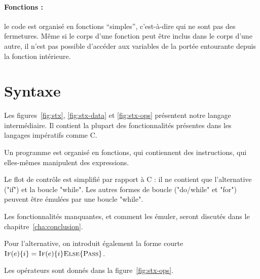 \paragraph{Fonctions :} le code est organisé en fonctions ``simples'',
c'est-à-dire qui ne sont pas des fermetures. Même si le corps
d'une fonction peut être inclus dans le corps d'une autre, il n'est pas possible
d'accéder aux variables de la portée entourante depuis la fonction intérieure.

\section{Syntaxe}

Les figures~\ref{fig:stx}, \ref{fig:stx-data} et \ref{fig:stx-ops} présentent
notre langage intermédiaire. Il contient la plupart des fonctionnalités
présentes dans les langages impératifs comme C.


Un programme est organisé en fonctions, qui contiennent des instructions, qui
elles-mêmes manipulent des expressions.

Le flot de contrôle est simplifié par rapport à C : il ne contient que
l'alternative ("if") et la boucle "while". Les autres formes de boucle
("do/while" et "for") peuvent être émulées par une boucle "while".

Les fonctionnalités manquantes, et comment les émuler, seront discutés dans le
chapitre~\ref{cha:conclusion}. %

Pour l'alternative, on introduit également la forme courte $\textsc{If}(e) \{ i \} =
\textsc{If}(e) \{ i \} \textsc{Else} \{ \textsc{Pass} \}$.

Les opérateurs sont donnés dans la figure~\ref{fig:stx-ops}.

